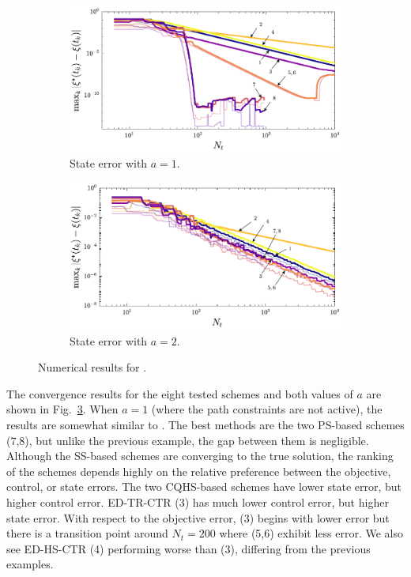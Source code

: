 \begin{figure}
\begin{subfigure}{0.5\textwidth}
\centering
\includegraphics[width=\textwidth]{../ch5/figures/ex3_sens_state_1_a1}%
\caption{State error with $a=1$.}
\label{fig:ch5:ex3sens:state:a1}
\end{subfigure}%
\begin{subfigure}{0.5\textwidth}
\centering
\includegraphics[width=\textwidth]{../ch5/figures/ex3_sens_state_1_a2}%
\caption{State error with $a=2$.}
\label{fig:ch5:ex3sens:state:a2}
\end{subfigure}%

\caption{Numerical results for .}
\label{fig:ch5:ex3sens}
\end{figure}

The convergence results for the eight tested schemes and both values of $a$ are shown in Fig.~\ref{fig:ch5:ex3sens}.
When $a=1$ (where the path constraints are not active), the results are somewhat similar to .
The best methods are the two PS-based schemes (7,8), but unlike the previous example, the gap between them is negligible.
Although the SS-based schemes are converging to the true solution, the ranking of the schemes depends highly on the relative preference between the objective, control, or state errors.
The two CQHS-based schemes have lower state error, but higher control error.
ED-TR-CTR (3) has much lower control error, but higher state error. 
With respect to the objective error, (3) begins with lower error but there is a transition point around $N_t=200$ where (5,6) exhibit less error.
We also see ED-HS-CTR (4) performing worse than (3), differing from the previous examples.

